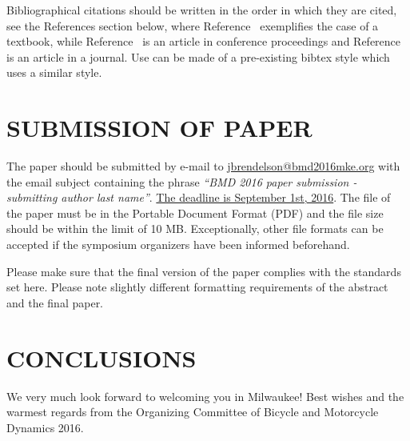 \documentclass{bmd2016p}
\begin{document}
Bibliographical citations should be written in the order in which they are 
cited, see the References section below, where Reference~\cite{Pac02} 
exemplifies the case of a textbook, while Reference~\cite{Ber07} is an article 
in conference proceedings and Reference~\cite{Sha71} is an article in a 
journal. Use can be made of a pre-existing bibtex style which uses a similar 
style.


\section{SUBMISSION OF PAPER}

The paper should be submitted by e-mail to \href{mailto:jbrendelson@bmd2016mke.org}{jbrendelson@bmd2016mke.org} with the email subject containing the phrase \textit{``BMD 2016 paper submission - submitting author last name''}. \uline{The deadline is September 1st, 2016}. The file of the paper must be in the Portable Document Format (PDF) and the file size should be within the limit of 10 MB. Exceptionally, other file formats can be accepted if the symposium organizers have been informed beforehand. 

Please make sure that the final version of the paper complies with the standards set here. Please note slightly different formatting requirements of the abstract and the final paper.

\section{CONCLUSIONS}

We very much look forward to welcoming you in Milwaukee! Best wishes and the 
warmest regards from the Organizing Committee of Bicycle and Motorcycle 
Dynamics 2016.
\end{document}
